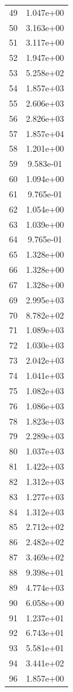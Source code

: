 \documentclass[12pt]{article}
\begin{document}
\begin{longtable}{@{}cc@{}}
49 & 1.047e+00 \\
50 & 3.163e+00 \\
51 & 3.117e+00 \\
52 & 1.947e+00 \\
53 & 5.258e+02 \\
54 & 1.857e+03 \\
55 & 2.606e+03 \\
56 & 2.826e+03 \\
57 & 1.857e+04 \\
58 & 1.201e+00 \\
59 & 9.583e-01 \\
60 & 1.094e+00 \\
61 & 9.765e-01 \\
62 & 1.054e+00 \\
63 & 1.039e+00 \\
64 & 9.765e-01 \\
65 & 1.328e+00 \\
66 & 1.328e+00 \\
67 & 1.328e+00 \\
69 & 2.995e+03 \\
70 & 8.782e+02 \\
71 & 1.089e+03 \\
72 & 1.030e+03 \\
73 & 2.042e+03 \\
74 & 1.041e+03 \\
75 & 1.082e+03 \\
76 & 1.086e+03 \\
78 & 1.823e+03 \\
79 & 2.289e+03 \\
80 & 1.037e+03 \\
81 & 1.422e+03 \\
82 & 1.312e+03 \\
83 & 1.277e+03 \\
84 & 1.312e+03 \\
85 & 2.712e+02 \\
86 & 2.482e+02 \\
87 & 3.469e+02 \\
88 & 9.398e+01 \\
89 & 4.774e+03 \\
90 & 6.058e+00 \\
91 & 1.237e+01 \\
92 & 6.743e+01 \\
93 & 5.581e+01 \\
94 & 3.441e+02 \\
96 & 1.857e+00 \\

\end{longtable}
\end{document}
